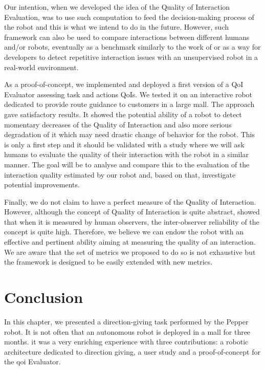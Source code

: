 \documentclass[a4paper,11pt,twoside]{StyleThese}
\begin{document}
Our intention, when we developed the idea of the Quality of Interaction Evaluation, was to use such computation to feed the decision-making process of the robot and this is what we intend to do in the future. However, such framework can also be used to compare interactions between different humans and/or robots, eventually as a benchmark similarly to the work of \cite{sanchez} or as a way for developers to detect repetitive interaction issues with an unsupervised robot in a real-world environment.

As a proof-of-concept, we implemented and deployed a first version of a QoI Evaluator assessing task and actions QoIs. We tested it on an interactive robot dedicated to provide route guidance to customers in a large mall. The approach gave satisfactory results. It showed the potential ability of a robot to detect momentary decreases of the Quality of Interaction and also more serious degradation of it which may need drastic change of behavior for the robot. This is only a first step and it should be validated with a study where we will ask humans to evaluate the quality of their interaction with the robot in a similar manner. The goal will be to analyse and compare this to the evaluation of the interaction quality estimated by our robot and, based on that, investigate potential improvements. 

Finally, we do not claim to have a perfect measure of the Quality of Interaction. However, although the concept of Quality of Interaction is quite abstract, \cite{movellan2007rubi} showed that when it is measured by human observers, the inter-observer reliability of the concept is quite high. Therefore, we believe we can endow the robot with an effective and pertinent ability aiming at measuring the quality of an interaction. We are aware that the set of metrics we proposed to do so is not exhaustive but the framework is designed to be easily extended with new metrics.

\section{Conclusion}

In this chapter, we presented a direction-giving task performed by the Pepper robot. It is not often that an autonomous robot is deployed in a mall for three months. it was a very enriching experience with three contributions: a robotic architecture dedicated to direction giving, a user study and a proof-of-concept for the \acrshort{qoi} Evaluator.
\end{document}
